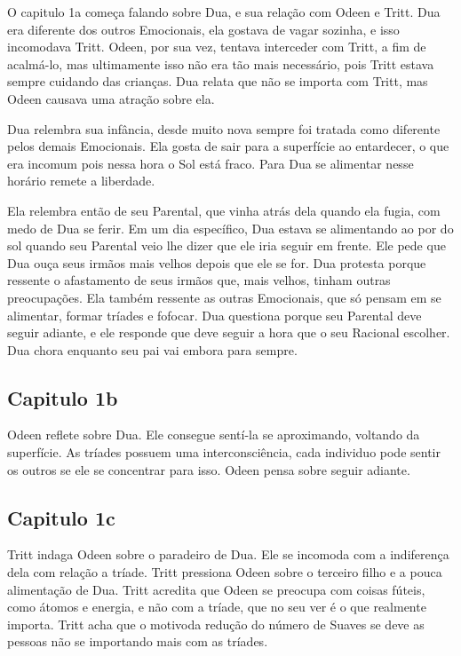 \documentclass[14pt,portuguese]{extreport}
\begin{document}
	O capitulo 1a começa falando sobre Dua, e sua relação com Odeen e Tritt. Dua era diferente dos outros Emocionais, ela gostava de vagar sozinha, e isso incomodava Tritt. Odeen, por sua vez,
	tentava interceder com Tritt, a fim de acalmá-lo, mas ultimamente isso não era tão mais necessário, pois Tritt estava sempre cuidando das crianças. Dua relata que não se importa com Tritt,
	mas Odeen causava uma atração sobre ela.
	
	Dua relembra sua infância, desde muito nova sempre foi tratada como diferente pelos demais Emocionais. Ela gosta de sair para a superfície ao entardecer, o que era incomum pois nessa hora o Sol
	está fraco. Para Dua se alimentar nesse horário remete a liberdade.
	
	Ela relembra então de seu Parental, que vinha atrás dela quando ela fugia, com medo de Dua se ferir. Em um dia específico, Dua estava se alimentando ao por do sol quando seu Parental veio lhe dizer
	que ele iria seguir em frente. Ele pede que Dua ouça seus irmãos mais velhos depois que ele se for. Dua protesta porque ressente o afastamento de seus irmãos que, mais velhos, tinham outras preocupações.
	Ela também ressente as outras Emocionais, que só pensam em se alimentar, formar tríades e fofocar. Dua questiona porque seu Parental deve seguir adiante, e ele responde que deve seguir a hora que o
	seu Racional escolher. Dua chora enquanto seu pai vai embora para sempre.
	
      \subsection{Capitulo 1b}
	
	Odeen reflete sobre Dua. Ele consegue sentí-la se aproximando, voltando da superfície. As tríades possuem uma interconsciência, cada individuo pode sentir os outros se ele se concentrar para isso.
	Odeen pensa sobre seguir adiante. 
	
	
      \subsection{Capitulo 1c}
      
	Tritt indaga Odeen sobre o paradeiro de Dua. Ele se incomoda com a indiferença dela com relação a tríade. Tritt pressiona Odeen sobre o terceiro filho e a pouca alimentação de Dua. Tritt acredita
	que Odeen se preocupa com coisas fúteis, como átomos e energia, e não com a tríade, que no seu ver é o que realmente importa. Tritt acha que o motivoda redução do número de Suaves se deve as pessoas não
	se importando mais com as tríades.
	
\end{document}
